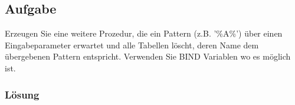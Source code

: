 \subsection{Aufgabe}
\label{sec:uebung_02.aufgabe_06}
Erzeugen Sie eine weitere Prozedur, die ein Pattern (z.B. '\%A\%') über einen Eingabeparameter erwartet und alle Tabellen löscht, deren Name dem übergebenen Pattern entspricht. Verwenden Sie BIND Variablen wo es möglich ist.

\subsubsection*{Lösung}
\label{sec:uebung_02.aufgabe_06.loesung}
